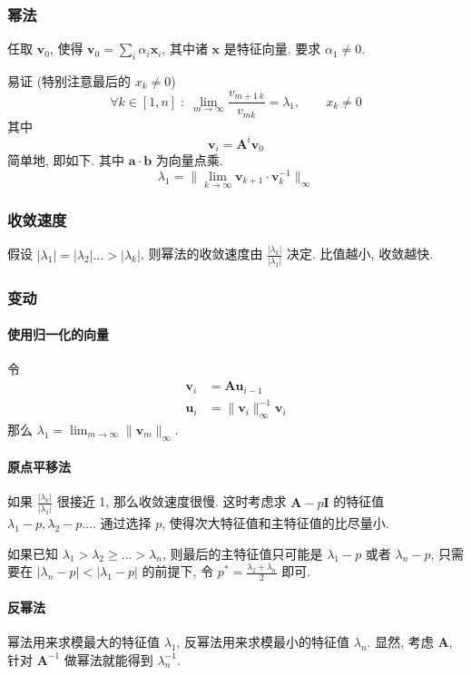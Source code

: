 \documentclass{ctexart}
\begin{document}
\subsubsection{幂法}
    任取 $\mathbf{v}_0$, 使得 $\mathbf{v}_0 = \sum_i \alpha_i \mathbf{x}_i$, 其中诸 $\mathbf{x}$ 是特征向量.
    要求 $\alpha_1 \neq 0$.\par
    易证 (特别注意最后的 $x_k \neq 0$) \[
        \forall k \in [1,n]\;:\; \lim_{m\to\infty} \frac{v_{m+1\,k}}{v_{mk}} = \lambda_1,\qquad x_k \neq 0\]
    其中 \[ \mathbf{v}_i = \mathbf{A}^i \mathbf{v}_0 \]
    简单地, 即如下. 其中 $\mathbf{a} \cdot \mathbf{b} $ 为向量点乘. \[
        \lambda_1 = \| \lim_{k \to \infty} \mathbf{v}_{k+1} \cdot \mathbf{v}_{k}^{-1} \|_{\infty}\]
\subsubsection{收敛速度}
    假设 $|\lambda_1| = |\lambda_2| \ldots > |\lambda_k|$, 则幂法的收敛速度由 $\frac{|\lambda_k|}{|\lambda_1|}$ 决定.
    比值越小, 收敛越快.
\subsubsection{变动}
\paragraph{使用归一化的向量}
    令\begin{align*}
        \mathbf{v}_i &= \mathbf{A} \mathbf{u}_{i-1}\\
        \mathbf{u}_i &= \|\mathbf{v}_i\|_{\infty}^{-1} \mathbf{v}_i
    \end{align*}
    那么 $\lambda_1 = \lim_{m\to\infty} \| \mathbf{v}_m \|_{\infty}$.
\paragraph{原点平移法}
    如果 $\frac{|\lambda_k|}{|\lambda_1|}$ 很接近 1, 那么收敛速度很慢.
    这时考虑求 $\mathbf{A} - p \mathbf{I} $ 的特征值 $\lambda_1 - p, \lambda_2 - p \ldots$.
    通过选择 $p$, 使得次大特征值和主特征值的比尽量小.\par
    如果已知 $\lambda_1 > \lambda_2 \ge \ldots > \lambda_n$,
    则最后的主特征值只可能是 $\lambda_1 -p$ 或者 $\lambda_n - p$, 只需要在
    $|\lambda_n - p| < |\lambda_1 - p|$ 的前提下, 令 $p^* = \frac{\lambda_2 + \lambda_n}{2}$ 即可.
\paragraph{反幂法}
    幂法用来求模最大的特征值 $\lambda_1$, 反幂法用来求模最小的特征值 $\lambda_n$.
    显然, 考虑 $\mathbf{A}$, 针对 $ \mathbf{A}^{-1}$ 做幂法就能得到 $\lambda_n^{-1}$.\par
\end{document}

